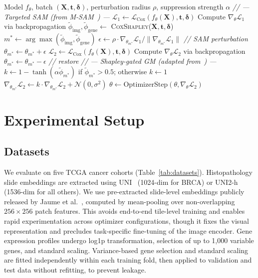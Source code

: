 \documentclass[runningheads]{llncs}
\begin{document}
\begin{algorithm}[t]
\caption{SGM-SAM Training Step}
\label{alg:sgmsam}
\begin{algorithmic}[1]
\REQUIRE Model $f_\theta$, batch $(\mathbf{X}, \mathbf{t}, \boldsymbol{\delta})$,
perturbation radius $\rho$, suppression strength $\alpha$
\STATE \textit{// --- Targeted SAM (from M-SAM~\cite{rajoli2025msam}) ---}
\STATE $\mathcal{L}_1 \leftarrow \mathcal{L}_{\text{Cox}}(f_\theta(\mathbf{X}), \mathbf{t}, \boldsymbol{\delta})$
\STATE Compute $\nabla_\theta \mathcal{L}_1$ via backpropagation
\STATE $\tilde\phi_{\text{img}},\tilde\phi_{\text{gene}} \leftarrow$ \textsc{CoxShapley}($\mathbf{X},\mathbf{t},\boldsymbol{\delta}$)
\STATE $m^* \leftarrow \arg\max(\tilde\phi_{\text{img}},\tilde\phi_{\text{gene}})$
\STATE $\epsilon \leftarrow \rho \cdot \nabla_{\theta_{m^*}} \mathcal{L}_1 / \|\nabla_{\theta_{m^*}} \mathcal{L}_1\|$ \hfill \textit{// SAM perturbation}
\STATE $\theta_{m^*} \leftarrow \theta_{m^*} + \epsilon$
\STATE $\mathcal{L}_2 \leftarrow \mathcal{L}_{\text{Cox}}(f_\theta(\mathbf{X}), \mathbf{t}, \boldsymbol{\delta})$
\STATE Compute $\nabla_\theta \mathcal{L}_2$ via backpropagation
\STATE $\theta_{m^*} \leftarrow \theta_{m^*} - \epsilon$ \hfill \textit{// restore}
\STATE \textit{// --- Shapley-gated GM (adapted from~\cite{peng2022ogm}) ---}
\STATE $k \leftarrow 1-\tanh(\alpha\tilde\phi_{m^*})$ if $\tilde\phi_{m^*}>0.5$; otherwise $k\leftarrow 1$
\STATE $\nabla_{\theta_{m^*}} \mathcal{L}_2 \leftarrow k \cdot \nabla_{\theta_{m^*}} \mathcal{L}_2 + \mathcal{N}(0, \sigma^2)$
\STATE $\theta \leftarrow \text{OptimizerStep}(\theta, \nabla_\theta \mathcal{L}_2)$
\end{algorithmic}
\end{algorithm}

\section{Experimental Setup}

\subsection{Datasets}

We evaluate on five TCGA cancer cohorts (Table~\ref{tab:datasets}).
Histopathology slide embeddings are extracted using
UNI~\cite{chen2024uni} (1024-dim for BRCA) or UNI2-h (1536-dim for
all others). We use pre-extracted slide-level embeddings publicly
released by Jaume et al.~\cite{jaume2024tangle}, computed by
mean-pooling over non-overlapping $256\!\times\!256$ patch features.
This avoids end-to-end tile-level training and enables rapid
experimentation across optimizer configurations, though it fixes the
visual representation and precludes task-specific fine-tuning of the
image encoder. Gene expression profiles undergo log1p transformation,
selection of up to 1{,}000 variable genes, and standard scaling.
Variance-based gene selection and standard scaling are fitted
independently within each training fold, then applied to
validation and test data without refitting, to prevent leakage.
\end{document}
